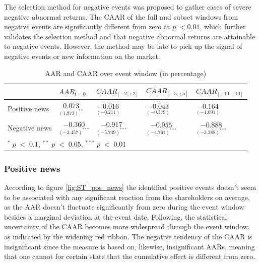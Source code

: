 The selection method for negative events was proposed to gather cases of severe negative abnormal returns. The CAAR of the full and subset windows from negative events are significantly different from zero at $p \; < 0.01$, which further validates the selection method and that negative abnormal returns are attainable to negative events. However, the method may be late to pick up the signal of negative events or new information on the market.  

\begin{table}[ht]
\centering
\caption{AAR and CAAR over event window (in percentage)} 
\begin{tabular}{lllll}
   \hline  \hline
  & $AAR_{t=0}$ & $CAAR_{[-2;+2]}$ & $CAAR_{[-5;+5]}$ & $CAAR_{[-10;+10]}$  \\
 \hline
Positive news & $\underset{(1.973)^{**}}{0.073}$  & $\underset{(-0.211)}{-0.016}$    & $\underset{(-0.379)}{-0.043}$ & $\underset{(-1.091)}{-0.164}$  \\ 
Negative news & $\underset{(-3.457)^{***}}{-0.360}$  & $\underset{(-5.749)^{***}}{-0.917}$    & $\underset{(-4.761)^{***}}{-0.955}$ & $\underset{(-3.288)^{***}}{-0.888}$  \\ 
   \hline
   \multicolumn{5}{p{12cm}}{\footnotesize  $^* \; p\; <\; 0.1$, $ ^{**} \; p\; <\; 0.05$, $ ^{***} \; p\; <\; 0.01$  } \\ 
\end{tabular}
\label{tab: ST_significace}
\end{table}

\subsubsection{Positive news}

According to figure \ref{fig:ST_pos_news} the identified positive events doesn't seem to be associated with any significant reaction from the shareholders on average, as the AAR doesn't fluctuate significantly from zero during the event window besides a marginal deviation at the event date. Following, the statistical uncertainty of the CAAR becomes more widespread through the event window, as indicated by the widening red ribbon. The negative tendency of the CAAR is insignificant since the measure is based on, likewise, insignificant AARs, meaning that one cannot for certain state that the cumulative effect is different from zero. 

